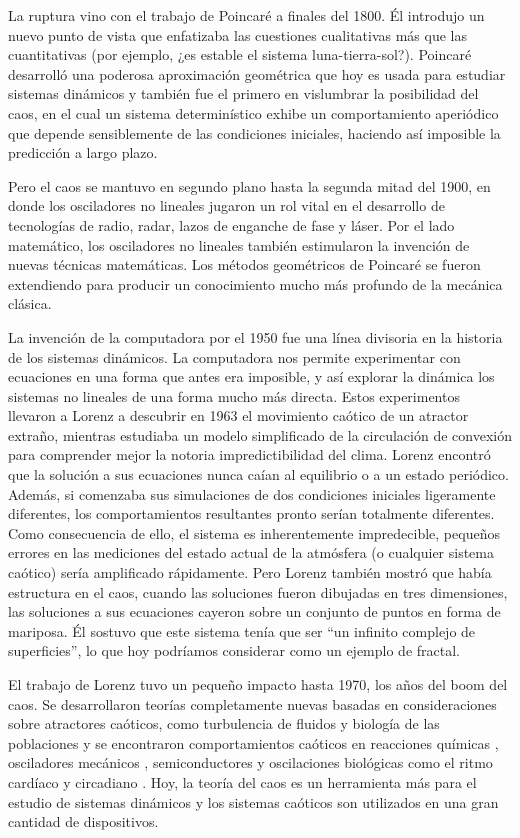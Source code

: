 La ruptura vino con el trabajo de Poincaré a finales del 1800.
Él introdujo un nuevo punto de vista que enfatizaba las cuestiones cualitativas más que las cuantitativas (por ejemplo, ¿es estable el sistema luna-tierra-sol?).
Poincaré desarrolló una poderosa aproximación geométrica que hoy es usada para estudiar sistemas dinámicos y también fue el primero en vislumbrar la posibilidad del caos, en el cual un sistema determinístico exhibe un comportamiento aperiódico que depende sensiblemente de las condiciones iniciales, haciendo así imposible la predicción a largo plazo.

Pero el caos se mantuvo en segundo plano hasta la segunda mitad del 1900, en donde los osciladores no lineales jugaron un rol vital en el desarrollo de tecnologías de radio, radar, lazos de enganche de fase y láser.
Por el lado matemático, los osciladores no lineales también estimularon la invención de nuevas técnicas matemáticas.
Los métodos geométricos de Poincaré se fueron extendiendo para producir un conocimiento mucho más profundo de la mecánica clásica.

La invención de la computadora por el 1950 fue una línea divisoria en la historia de los sistemas dinámicos.
La computadora nos permite experimentar con ecuaciones en una forma que antes era imposible, y así explorar la dinámica los sistemas no lineales de una forma mucho más directa.
Estos experimentos llevaron a Lorenz a descubrir en 1963 el movimiento caótico de un atractor extraño, mientras estudiaba un modelo simplificado de la circulación de convexión para comprender mejor la notoria impredictibilidad del clima.
Lorenz encontró que la solución a sus ecuaciones nunca caían al equilibrio o a un estado periódico.
Además, si comenzaba sus simulaciones de dos condiciones iniciales ligeramente diferentes, los comportamientos resultantes pronto serían
totalmente diferentes.
Como consecuencia de ello, el sistema es inherentemente impredecible, pequeños errores en las mediciones del estado actual de la atmósfera (o cualquier sistema caótico) sería amplificado rápidamente.
Pero Lorenz también mostró que había estructura en el caos, cuando las soluciones fueron dibujadas en tres dimensiones, las soluciones a sus ecuaciones cayeron sobre un conjunto de puntos en forma de mariposa.
Él sostuvo que este sistema tenía que ser “un infinito complejo de superficies”, lo que hoy podríamos considerar como un ejemplo de fractal.

El trabajo de Lorenz tuvo un pequeño impacto hasta 1970, los años del boom del caos.
Se desarrollaron teorías completamente nuevas basadas en consideraciones sobre atractores caóticos, como turbulencia de fluidos y biología de las poblaciones y se encontraron comportamientos caóticos en reacciones químicas \cite{Kapral1995}, osciladores mecánicos \cite{Awrejcewicz2003}, semiconductores \cite{Scholl2001} y oscilaciones biológicas como el ritmo cardíaco y circadiano \cite{Strogatz2018}.
Hoy, la teoría del caos es un herramienta más para el estudio de sistemas dinámicos y los sistemas caóticos son utilizados en una gran cantidad de dispositivos.

